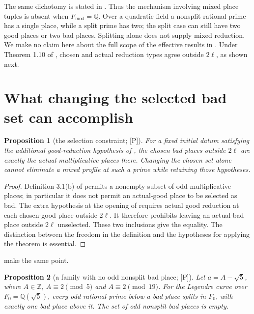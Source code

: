 \documentclass[11pt]{article}
\theoremstyle{plain}
\newtheorem{proposition}{Proposition}
\theoremstyle{definition}
\newcommand{\Fmod}{F_{\mathrm{mod}}}
\begin{document}
The same dichotomy is stated in \cite[Prop.~2, Cor.~3]{First}.
Thus the mechanism involving mixed place tuples is absent when
$\Fmod=\mathbb Q$.  Over a quadratic field a nonsplit rational prime has a
single place, while a split prime has two; the split case can still have two
good places or two bad places.  Splitting alone does not supply mixed reduction.
We make no claim here about the full scope of the effective results in
\cite{MFHMP}.  Under Theorem 1.10 of \cite{IUT4}, chosen and actual reduction
types agree outside $2\ell$, as shown next.


\section{What changing the selected bad set can accomplish}\label{s:repair}

\begin{proposition}[the selection constraint; \textup{[P]}]\label{p:selection}
For a fixed initial datum satisfying the additional good-reduction hypothesis
of \cite[Theorem 1.10]{IUT4}, the chosen bad places outside $2\ell$ are exactly
the actual multiplicative places there.  Changing the chosen set alone cannot
eliminate a mixed profile at such a prime while retaining those hypotheses.
\end{proposition}

\begin{proof}
Definition 3.1(b) of \cite{IUT1} permits a nonempty subset of odd multiplicative
places; in particular it does not permit an actual-good place to be selected
as bad.  The extra hypothesis at the opening of \cite[Theorem 1.10, p.~22]{IUT4}
requires actual good reduction at each chosen-good place outside $2\ell$.
It therefore prohibits leaving an actual-bad place outside $2\ell$ unselected.
These two inclusions give the equality.  The distinction between the freedom
in the definition and the hypotheses for applying the theorem is essential.
\end{proof}

\cite[Question~1, Remark~3]{First} make the same point.

\begin{proposition}[a family with no odd nonsplit bad place; \textup{[P]}]
\label{p:allsplit}
Let $a=A-\sqrt5$, where $A\in\mathbb Z$, $A\equiv2\pmod5$ and
$A\equiv2\pmod{19}$.  For the Legendre curve over $F_0=\mathbb Q(\sqrt5)$,
every odd rational prime below a bad place splits in $F_0$, with exactly one
bad place above it.  The set of odd nonsplit bad places is empty.
\end{proposition}
\end{document}
